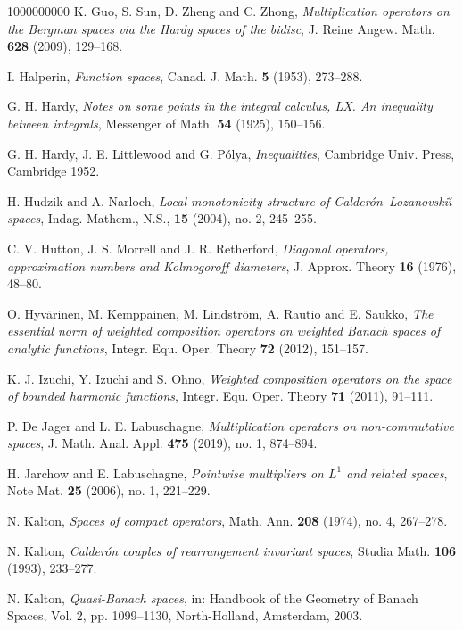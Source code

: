 \documentclass[11pt]{amsart}
\theoremstyle{definition}
\theoremstyle{definition}
\theoremstyle{definition}
\theoremstyle{definition}
\theoremstyle{definition}
\theoremstyle{definition}
\theoremstyle{definition}
\theoremstyle{definition}
\numberwithin{equation}{section}
\numberwithin{equation}{section}
\numberwithin{equation}{section}
\theoremstyle{definition}
\theoremstyle{definition}
\theoremstyle{definition}
\theoremstyle{definition}
\theoremstyle{definition}
\theoremstyle{definition}
\begin{document}
\begin{thebibliography}{1000000000}
	 K. Guo, S. Sun, D. Zheng and C. Zhong, {\it Multiplication operators on the Bergman spaces via the Hardy spaces of the bidisc},
		J. Reine Angew. Math. {\bf 628} (2009), 129--168.
		
	 I. Halperin, {\it Function spaces}, Canad. J. Math. {\bf 5} (1953), 273--288.
		
	 G. H. Hardy, {\it Notes on some points in the integral calculus, LX. An inequality between integrals}, Messenger of Math. {\bf 54} (1925), 150--156.
		
	 G. H. Hardy, J. E. Littlewood and G. P{\' o}lya, {\it Inequalities}, Cambridge Univ. Press, Cambridge 1952.
		
	 H. Hudzik and  A. Narloch, {\it Local monotonicity structure of Calder{\' o}n--Lozanovski{\u \i} spaces}, Indag. Mathem., N.S., {\bf 15} (2004), no. 2, 245--255.
	
	 C. V. Hutton, J. S. Morrell and J. R. Retherford, {\it Diagonal operators, approximation numbers and Kolmogoroff diameters}, J. Approx. Theory {\bf 16} (1976), 48--80.
		
	 O. Hyv{\" a}rinen, M. Kemppainen, M. Lindstr{\" o}m, A. Rautio and E. Saukko, {\it The essential norm of weighted composition
		operators on weighted Banach spaces of analytic functions}, Integr. Equ. Oper. Theory {\bf 72} (2012), 151--157.
		
	 K. J. Izuchi, Y. Izuchi and S. Ohno, {\it Weighted composition operators on the space of bounded harmonic functions},
		Integr. Equ. Oper. Theory {\bf 71} (2011), 91--111.
	
	 P. De Jager and L. E. Labuschagne, {\it Multiplication operators on non-commutative spaces}, J. Math. Anal. Appl. {\bf 475} (2019), no. 1, 874--894.
	
	 H. Jarchow and E. Labuschagne, {\it Pointwise multipliers on $L^1$ and related spaces}, Note Mat. {\bf 25} (2006), no. 1, 221--229.
		
	 N. Kalton, {\it Spaces of compact operators}, Math. Ann. {\bf 208} (1974), no. 4, 267--278.
	
	 N. Kalton, {\it Calder{\' o}n couples of rearrangement invariant spaces}, Studia Math. {\bf 106} (1993), 233--277.
	
	 N. Kalton, {\it Quasi-Banach spaces}, in: Handbook of the Geometry of Banach Spaces, Vol. 2, pp. 1099--1130, North-Holland, Amsterdam, 2003.
	

\end{thebibliography}
\end{document}
